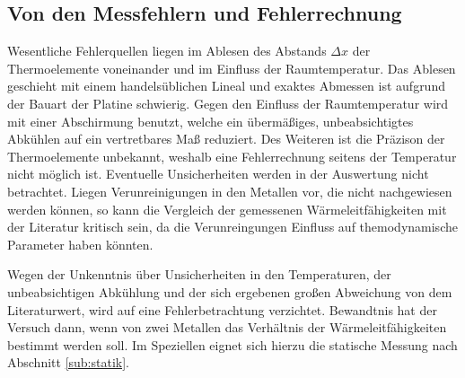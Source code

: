 \subsection{Von den Messfehlern und Fehlerrechnung}
Wesentliche Fehlerquellen liegen im Ablesen des Abstands $\Delta{x}$ der Thermoelemente voneinander und im Einfluss der Raumtemperatur.
Das Ablesen geschieht mit einem handelsüblichen Lineal und exaktes Abmessen ist aufgrund der Bauart der Platine schwierig. 
Gegen den Einfluss der Raumtemperatur wird mit einer Abschirmung benutzt, welche ein übermäßiges, unbeabsichtigtes Abkühlen auf ein vertretbares Maß reduziert. Des Weiteren ist die Präzison der Thermoelemente unbekannt, weshalb eine Fehlerrechnung seitens der Temperatur nicht möglich ist. Eventuelle Unsicherheiten werden in der Auswertung nicht betrachtet.
Liegen Verunreinigungen in den Metallen vor, die nicht nachgewiesen werden können, so kann die Vergleich der gemessenen Wärmeleitfähigkeiten mit der Literatur kritisch sein, 
da die Verunreingungen Einfluss auf themodynamische Parameter haben könnten.

Wegen der Unkenntnis über Unsicherheiten in den Temperaturen, der unbeabsichtigen Abkühlung und der sich ergebenen großen Abweichung von dem Literaturwert, wird auf eine Fehlerbetrachtung verzichtet. 
Bewandtnis hat der Versuch dann, wenn von zwei Metallen das Verhältnis der Wärmeleitfähigkeiten bestimmt werden soll. Im Speziellen eignet sich hierzu die statische Messung nach Abschnitt \ref{sub:statik}.

